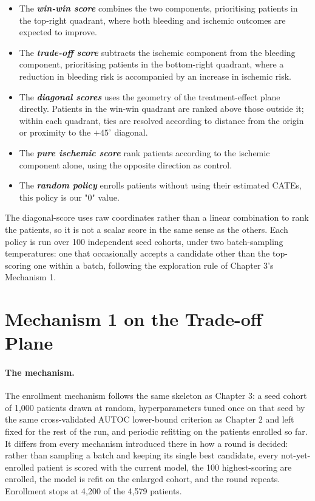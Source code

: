 \begin{itemize}
    \item The \emph{\textbf{win-win score}} combines the two components, prioritising patients in the top-right quadrant, where both bleeding and ischemic outcomes are expected to improve.
    
    \item The \emph{\textbf{trade-off score}} subtracts the ischemic component from the bleeding component, prioritising patients in the bottom-right quadrant, where a reduction in bleeding risk is accompanied by an increase in ischemic risk.
    
    \item The \emph{\textbf{diagonal scores}} uses the geometry of the treatment-effect plane directly. Patients in the win-win quadrant are ranked above those outside it; within each quadrant, ties are resolved according to distance from the origin or proximity to the $+45^\circ$ diagonal.
    
    \item The \emph{\textbf{pure ischemic score}} rank patients according to the ischemic component alone, using the opposite direction as control.
    
    \item The \emph{\textbf{random policy}} enrolls patients without using their estimated CATEs, this policy is our "0" value.
\end{itemize}

\vspace{10pt}

The diagonal-score uses raw coordinates rather than a linear combination
to rank the patients, so it is not a scalar score in the same sense as the others.
Each policy is run over 100 independent seed cohorts, under two batch-sampling
temperatures: one that occasionally accepts a candidate other than the top-scoring one
within a batch, following the exploration rule of Chapter 3's Mechanism 1.


\section{Mechanism 1 on the Trade-off Plane}

\paragraph{The mechanism.}
The enrollment mechanism follows the same skeleton as Chapter 3: a seed cohort of 1,000
patients drawn at random, hyperparameters tuned once on that seed by the same
cross-validated AUTOC lower-bound criterion as Chapter 2 and left fixed for the rest of
the run, and periodic refitting on the patients enrolled so far. It differs from every
mechanism introduced there in how a round is decided: rather than sampling a batch and
keeping its single best candidate, every not-yet-enrolled patient is scored with the
current model, the 100 highest-scoring are enrolled, the model is refit on the enlarged
cohort, and the round repeats. Enrollment stops at 4,200 of the 4,579 patients.

